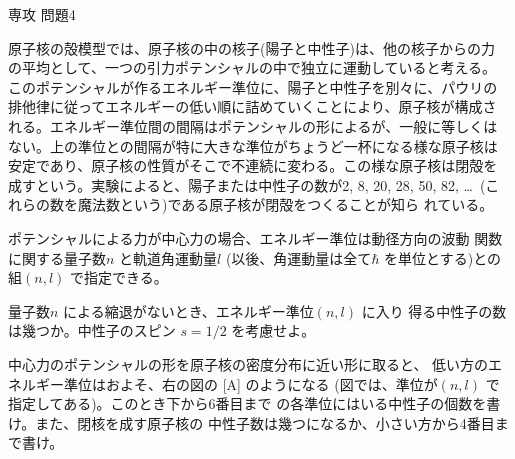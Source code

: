 \documentclass[fleqn]{jbook}
\begin{document}
\begin{question}{専攻 問題4}{}
\def\Vec#1{\vec{\mathstrut #1}}
\def\Mean#1{\langle{#1}\rangle}
\def\Ca{\Atom{Ca}{20}{41}$_{21}$}
\def\Sc{\Atom{Sc}{21}{41}$_{20}$}


原子核の殻模型では、原子核の中の核子(陽子と中性子)は、他の核子からの力
の平均として、一つの引力ポテンシャルの中で独立に運動していると考える。
このポテンシャルが作るエネルギー準位に、陽子と中性子を別々に、パウリの
排他律に従ってエネルギーの低い順に詰めていくことにより、原子核が構成さ
れる。エネルギー準位間の間隔はポテンシャルの形によるが、一般に等しくは
ない。上の準位との間隔が特に大きな準位がちょうど一杯になる様な原子核は
安定であり、原子核の性質がそこで不連続に変わる。この様な原子核は閉殻を
成すという。実験によると、陽子または中性子の数が2, 8, 20, 28, 50, 82,
\ldots \ (これらの数を魔法数という)である原子核が閉殻をつくることが知ら
れている。

\begin{subquestions}
\SubQuestion
  \parbox[t]{105mm}{
  ポテンシャルによる力が中心力の場合、エネルギー準位は動径方向の波動
  関数に関する量子数$n$ と軌道角運動量$l$ (以後、角運動量は全て$\hbar$
  を単位とする)との組$(n,l)$ で指定できる。

  \begin{subsubquestions}
  \SubSubQuestion
   量子数$n$ による縮退がないとき、エネルギー準位$(n,l)$ に入り
   得る中性子の数は幾つか。中性子のスピン $s\!=\!1/2$ を考慮せよ。

  \SubSubQuestion
    中心力のポテンシャルの形を原子核の密度分布に近い形に取ると、
    低い方のエネルギー準位はおよそ、右の図の [A] のようになる
    (図では、準位が$(n,l)$ で指定してある)。このとき下から6番目まで
    の各準位にはいる中性子の個数を書け。また、閉核を成す原子核の
    中性子数は幾つになるか、小さい方から4番目まで書け。

  \end{subsubquestions}
  }\parbox[t]{55mm}{
    \vspace*{-10mm}\begin{center}
    \end{center}
  }


\end{subquestions}
\end{question}
\end{document}
